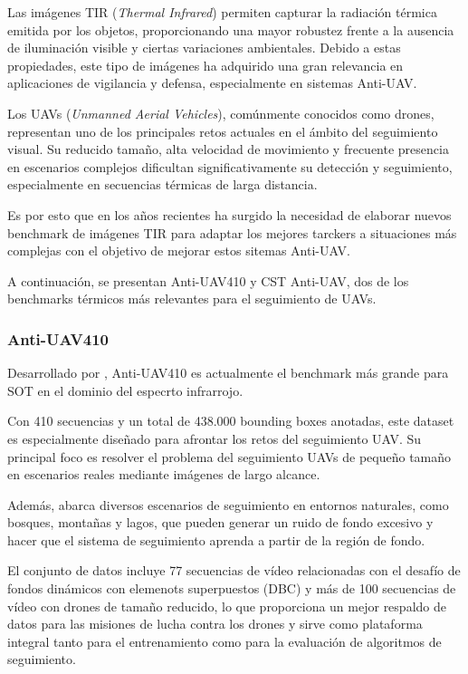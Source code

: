 Las imágenes TIR (\textit{Thermal Infrared}) permiten capturar la radiación térmica emitida por los objetos, proporcionando una mayor robustez frente a la ausencia de iluminación visible y ciertas variaciones ambientales. Debido a estas propiedades, este tipo de imágenes ha adquirido una gran relevancia en aplicaciones de vigilancia y defensa, especialmente en sistemas Anti-UAV.

Los UAVs (\textit{Unmanned Aerial Vehicles}), comúnmente conocidos como drones, representan uno de los principales retos actuales en el ámbito del seguimiento visual. Su reducido tamaño, alta velocidad de movimiento y frecuente presencia en escenarios complejos dificultan significativamente su detección y seguimiento, especialmente en secuencias térmicas de larga distancia.

Es por esto que en los años recientes ha surgido la necesidad de elaborar nuevos benchmark de imágenes TIR para adaptar los mejores tarckers a situaciones más complejas con el objetivo de mejorar estos sitemas Anti-UAV.

A continuación, se presentan Anti-UAV410 y CST Anti-UAV, dos de los benchmarks térmicos más relevantes para el seguimiento de UAVs.

\subsubsection{Anti-UAV410}
Desarrollado por \cite{UAV410}, Anti-UAV410 es actualmente el benchmark más grande para SOT en el dominio del especrto infrarrojo. 

Con 410 secuencias y un total de 438.000 bounding boxes anotadas, este dataset es especialmente diseñado para afrontar los retos del seguimiento UAV. Su principal foco es resolver el problema del seguimiento UAVs de pequeño tamaño en escenarios reales mediante imágenes de largo alcance.

Además, abarca diversos escenarios de seguimiento en entornos naturales, como bosques, montañas y lagos, que pueden generar un ruido de fondo excesivo y hacer que el sistema de seguimiento aprenda a partir de la región de fondo.

El conjunto de datos incluye 77 secuencias de vídeo relacionadas con el desafío de fondos dinámicos con elemenots superpuestos (DBC) y más de 100 secuencias de vídeo con drones de tamaño reducido, lo que proporciona un mejor respaldo de datos para las misiones de lucha contra los drones y sirve como plataforma integral tanto para el entrenamiento como para la evaluación de algoritmos de seguimiento.

